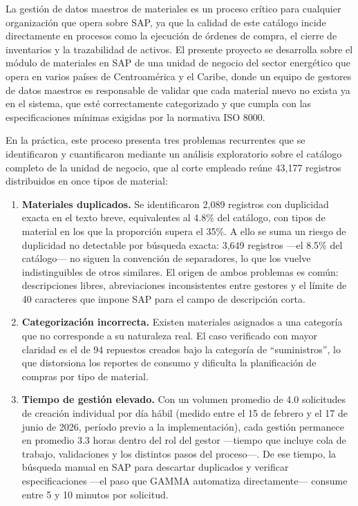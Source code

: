 La gestión de datos maestros de materiales es un proceso crítico para cualquier organización que opera sobre SAP, ya que la calidad de este catálogo incide directamente en procesos como la ejecución de órdenes de compra, el cierre de inventarios y la trazabilidad de activos. El presente proyecto se desarrolla sobre el módulo de materiales en SAP de una unidad de negocio del sector energético que opera en varios países de Centroamérica y el Caribe, donde un equipo de gestores de datos maestros es responsable de validar que cada material nuevo no exista ya en el sistema, que esté correctamente categorizado y que cumpla con las especificaciones mínimas exigidas por la normativa ISO 8000.

En la práctica, este proceso presenta tres problemas recurrentes que se identificaron y cuantificaron mediante un análisis exploratorio sobre el catálogo completo de la unidad de negocio, que al corte empleado reúne 43,177 registros distribuidos en once tipos de material:

\begin{enumerate}
	\item \textbf{Materiales duplicados.} Se identificaron 2,089 registros con duplicidad exacta en el texto breve, equivalentes al 4.8\% del catálogo, con tipos de material en los que la proporción supera el 35\%. A ello se suma un riesgo de duplicidad no detectable por búsqueda exacta: 3,649 registros —el 8.5\% del catálogo— no siguen la convención de separadores, lo que los vuelve indistinguibles de otros similares. El origen de ambos problemas es común: descripciones libres, abreviaciones inconsistentes entre gestores y el límite de 40 caracteres que impone SAP para el campo de descripción corta.
	\item \textbf{Categorización incorrecta.} Existen materiales asignados a una categoría que no corresponde a su naturaleza real. El caso verificado con mayor claridad es el de 94 repuestos creados bajo la categoría de ``suministros'', lo que distorsiona los reportes de consumo y dificulta la planificación de compras por tipo de material.
	\item \textbf{Tiempo de gestión elevado.} Con un volumen promedio de 4.0 solicitudes de creación individual por día hábil (medido entre el 15 de febrero y el 17 de junio de 2026, período previo a la implementación), cada gestión permanece en promedio 3.3 horas dentro del rol del gestor —tiempo que incluye cola de trabajo, validaciones y los distintos pasos del proceso—. De ese tiempo, la búsqueda manual en SAP para descartar duplicados y verificar especificaciones —el paso que GAMMA automatiza directamente— consume entre 5 y 10 minutos por solicitud.
\end{enumerate}

